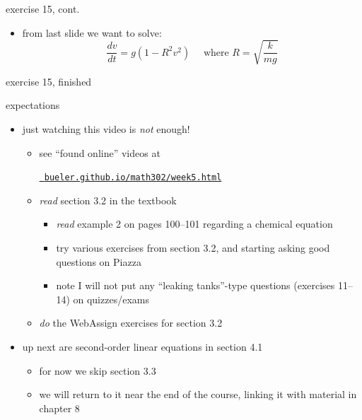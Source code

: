 \documentclass{beamer}
\begin{document}
\begin{frame}{exercise 15, cont.}

\begin{itemize}
\item from last slide we want to solve:
   $$\frac{dv}{dt} = g \left(1 - R^2 v^2\right) \quad \text{ where } R=\sqrt{\frac{k}{mg}}$$
\end{itemize}

\vspace{60mm}
\end{frame}


\begin{frame}{exercise 15, finished}

\end{frame}

\begin{frame}{expectations}

\begin{itemize}
\item just watching this video is \emph{not} enough!
     \begin{itemize}
     \item see ``found online'' videos at

     \centerline{\href{https://bueler.github.io/math302/week5.html}{\tt \color{cyan} bueler.github.io/math302/week5.html}}
     \item \emph{read} section 3.2 in the textbook
         \begin{itemize}
         \item \emph{read} example 2 on pages 100--101 regarding a chemical equation
         \item try various exercises from section 3.2, and starting asking good questions on Piazza
         \item note I will not put any ``leaking tanks''-type questions (exercises 11--14) on quizzes/exams
         \end{itemize}
     \item \emph{do} the WebAssign exercises for section 3.2
     \end{itemize}

\bigskip
\item up next are second-order linear equations in section 4.1
    \begin{itemize}
    \item for now we skip section 3.3
    \item we will return to it near the end of the course, linking it with material in chapter 8
    \end{itemize}
\end{itemize}
\end{frame}
\end{document}
